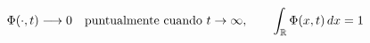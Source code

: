 \documentclass[preview]{standalone}
\begin{document}
\begin{align*}
\special{dvisvgm:raw <g id='unique000'>}\Phi(\cdot,t)\longrightarrow 0\quad\text{puntualmente cuando }t\to\infty,\qquad\int_{\mathbb R}\Phi(x,t)\,dx=1\special{dvisvgm:raw </g>}
\end{align*}
\end{document}
